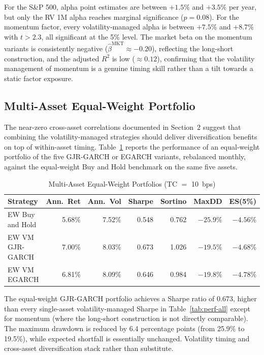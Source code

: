 \documentclass[12pt, a4paper]{article}
\begin{document}
For the S\&P 500, alpha point estimates are between $+1.5\%$ and $+3.5\%$ per year, but
only the RV 1M alpha reaches marginal significance ($p=0.08$). For the momentum factor,
every volatility-managed alpha is between $+7.5\%$ and $+8.7\%$ with $t>2.3$, all
significant at the 5\% level. The market beta on the momentum variants is consistently
negative ($\hat\beta^{\mathrm{MKT}}\approx -0.20$), reflecting the long-short construction,
and the adjusted $R^2$ is low ($\approx 0.12$), confirming that the volatility management
of momentum is a genuine timing skill rather than a tilt towards a static factor exposure.

\subsection{Multi-Asset Equal-Weight Portfolio}

The near-zero cross-asset correlations documented in Section~2 suggest that combining the
volatility-managed strategies should deliver diversification benefits on top of within-asset
timing. Table~\ref{tab:multi} reports the performance of an equal-weight portfolio of the
five GJR-GARCH or EGARCH variants, rebalanced monthly, against the equal-weight Buy and
Hold benchmark on the same five assets.

\begin{table}[H]
\centering
\small
\caption{Multi-Asset Equal-Weight Portfolios (TC $=$ 10~bps)}
\label{tab:multi}
\begin{tabular}{lrrrrrr}
\toprule
\textbf{Strategy} & \textbf{Ann.\ Ret} & \textbf{Ann.\ Vol} & \textbf{Sharpe} & \textbf{Sortino} & \textbf{MaxDD} & \textbf{ES(5\%)}\\
\midrule
EW Buy and Hold     & 5.68\% & 7.52\% & 0.548 & 0.762 & $-25.9\%$ & $-4.56\%$\\
EW VM GJR-GARCH     & 7.00\% & 8.03\% & 0.673 & 1.026 & $-19.5\%$ & $-4.68\%$\\
EW VM EGARCH        & 6.81\% & 8.09\% & 0.646 & 0.984 & $-19.8\%$ & $-4.78\%$\\
\bottomrule
\end{tabular}
\end{table}

\noindent The equal-weight GJR-GARCH portfolio achieves a Sharpe ratio of 0.673, higher
than every single-asset volatility-managed Sharpe in Table~\ref{tab:perf-all} except for
momentum (where the long-short construction is not directly comparable). The maximum
drawdown is reduced by 6.4 percentage points (from 25.9\% to 19.5\%), while expected
shortfall is essentially unchanged. Volatility timing and cross-asset diversification stack
rather than substitute.
\end{document}
